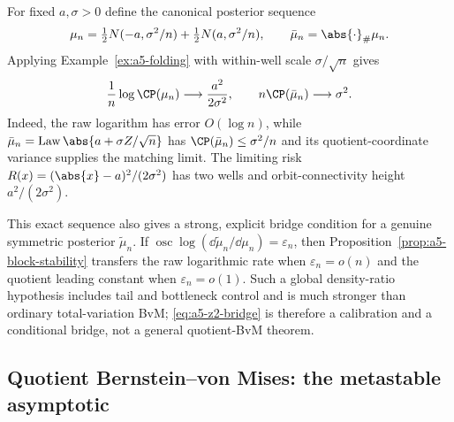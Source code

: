 \documentclass[../../main.tex]{subfiles}
\begin{document}
\begin{example}
\label{ex:a5-z2-bridge}
For fixed $a,\sigma>0$ define the canonical posterior sequence
\[
 \mu_n=\tfrac12N(-a,\sigma^2/n)+\tfrac12N(a,\sigma^2/n),
 \qquad \bar\mu_n=\abs{\cdot}_\#\mu_n.
\]
Applying Example~\ref{ex:a5-folding} with within-well scale $\sigma/\sqrt n$ gives
\begin{equation}\label{eq:a5-z2-bridge}
 \frac1n\log\CP(\mu_n)\longrightarrow\frac{a^2}{2\sigma^2},
 \qquad n\CP(\bar\mu_n)\longrightarrow\sigma^2.
\end{equation}
Indeed, the raw logarithm has error $O(\log n)$, while
$\bar\mu_n=\operatorname{Law}\abs{a+\sigma Z/\sqrt n}$ has
$\CP(\bar\mu_n)\le\sigma^2/n$ and its quotient-coordinate variance supplies the matching limit.
The limiting risk $R(x)=(\abs{x}-a)^2/(2\sigma^2)$ has two wells and orbit-connectivity height
$a^2/(2\sigma^2)$.

This exact sequence also gives a strong, explicit bridge condition for a genuine symmetric
posterior $\widetilde\mu_n$. If
$\operatorname*{osc}\log(\dd\widetilde\mu_n/\dd\mu_n)=\varepsilon_n$, then
Proposition~\ref{prop:a5-block-stability} transfers the raw logarithmic rate when
$\varepsilon_n=o(n)$ and the quotient leading constant when $\varepsilon_n=o(1)$. Such a global
density-ratio hypothesis includes tail and bottleneck control and is much stronger than ordinary
total-variation BvM; \eqref{eq:a5-z2-bridge} is therefore a calibration and a conditional bridge,
not a general quotient-BvM theorem.
\end{example}

\subsection{Quotient Bernstein--von Mises: the metastable asymptotic}
\label{subsec:a5-metastable}
\end{document}
